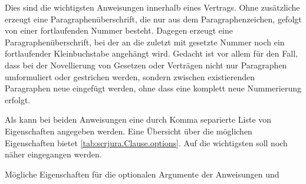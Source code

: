 \begin{Declaration}
  \label{desc:scrjura.contract.macro.Clause}%
  \label{desc:scrjura.contract.macro.SubClause}%
\end{Declaration}
Dies sind die wichtigsten Anweisungen innerhalb eines Vertrags. Ohne
zusätzliche  erzeugt  eine
Paragraphenüberschrift, die nur aus dem Paragraphenzeichen, gefolgt von einer
fortlaufenden Nummer besteht. Dagegen erzeugt  eine
Paragraphenüberschrift, bei der an die zuletzt mit  gesetzte
Nummer noch ein fortlaufender Kleinbuchstabe angehängt wird. Gedacht ist
 vor allem für den Fall, dass bei der Novellierung von
Gesetzen oder Verträgen nicht nur Paragraphen umformuliert oder gestrichen
werden, sondern zwischen existierenden Paragraphen neue eingefügt werden, ohne
dass eine komplett neue Nummerierung erfolgt.

Als  kann bei beiden Anweisungen eine durch Komma
separierte Liste von Eigenschaften angegeben werden. Eine Übersicht über die
möglichen Eigenschaften bietet \autoref{tab:scrjura.Clause.options}. Auf die
wichtigsten soll noch näher eingegangen werden.

\begin{table}
  \caption{Mögliche Eigenschaften für die optionalen Argumente der Anweisungen
     und }
  \label{tab:scrjura.Clause.options}
  \begin{desctabular}
  \end{desctabular} 
\end{table}

